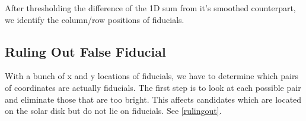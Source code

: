 \documentclass[10pt]{scrartcl}
\begin{document}
After thresholding the difference of the 1D sum from it's smoothed counterpart, we identify the column/row positions of fiducials. 

\subsection{Ruling Out False Fiducial} %
\label{sub:ruling_out_false_fiducial}

With a bunch of x and y locations of fiducials, we have to determine which pairs of coordinates are actually fiducials. The first step is to look at each possible pair and eliminate those that are too bright. This affects candidates which are located on the solar disk but do not lie on fiducials. See \cref{rulingout}.


\begin{figure}[!ht]
\end{figure}
\end{document}
